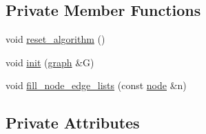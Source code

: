 \subsection*{Private Member Functions}
\begin{DoxyCompactItemize}
\item 
void \mbox{\hyperlink{classbid__dijkstra_a16574970a28a3f453011e5b98d63e191}{reset\+\_\+algorithm}} ()
\item 
void \mbox{\hyperlink{classbid__dijkstra_a3736aecbafb02384dd684d6d4fa4bd8d}{init}} (\mbox{\hyperlink{classgraph}{graph}} \&G)
\item 
void \mbox{\hyperlink{classbid__dijkstra_a279264a4cee9a4a8ad45ec957245e90a}{fill\+\_\+node\+\_\+edge\+\_\+lists}} (const \mbox{\hyperlink{classnode}{node}} \&n)
\end{DoxyCompactItemize}
\subsection*{Private Attributes}
